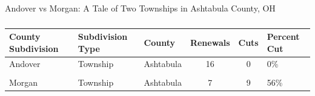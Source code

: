 \documentclass{beamer}
\begin{document}
\begin{frame}{Andover vs Morgan: A Tale of Two Townships in Ashtabula County, OH}
    \frametitle{}
    \begin{table}[ht]
        \centering
        \label{tab:ash_tale}
        \begin{tabular}{p{1cm}p{1.5cm}p{1cm}ccp{1.5cm}}
            \hline
            \scriptsize County Subdivision & \scriptsize Subdivision Type & \scriptsize County & \scriptsize Renewals & \scriptsize Cuts & \scriptsize Percent Cut \\      \hline
            \scriptsize Andover & \scriptsize Township & \scriptsize Ashtabula & \scriptsize 16 & \scriptsize 0 & \scriptsize 0\% \\
            \\
            \scriptsize Morgan & \scriptsize Township & \scriptsize Ashtabula & \scriptsize 7 & \scriptsize 9 & \scriptsize 56\% \\
            \hline       \end{tabular}
    \end{table}
\end{frame}
\end{document}
